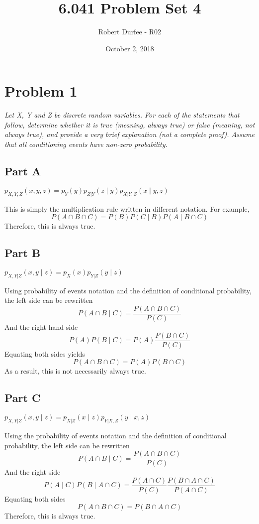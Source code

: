 \documentclass{article}
\title{6.041 Problem Set 4}
\author{Robert Durfee - R02}
\date{October 2, 2018}
\begin{document}
\maketitle

\section*{Problem 1}

\textit{Let X, Y and Z be discrete random variables. For each of the
statements that follow, determine whether it is true (meaning, always true)
or false (meaning, not always true), and provide a very brief explanation
(not a complete proof). Assume that all conditioning events have non-zero
probability.}

\subsection*{Part A}

\textit{$ p_{X,Y,Z}(x, y, z) = p_Y(y) p_{Z|Y}(z \mid y) p_{X|Y,Z}(x \mid y, z) $}

\bigbreak

This is simply the multiplication rule written in different notation. For
example,
$$ P(A \cap B \cap C) = P(B) P(C \mid B) P(A \mid B \cap C) $$
Therefore, this is always true.

\subsection*{Part B}

\textit{$ p_{X,Y|Z}(x, y \mid z) = p_X(x) p_{Y|Z} (y \mid z) $}

\bigbreak

Using probability of events notation and the definition of conditional
probability, the left side can be rewritten
$$ P(A \cap B \mid C) = \frac{P(A \cap B \cap C)}{P(C)} $$
And the right hand side
$$ P(A) P(B \mid C) = P(A) \frac{P(B \cap C)}{P(C)} $$
Equating both sides yields
$$ P(A \cap B \cap C) = P(A) P(B \cap C) $$
As a result, this is not necessarily always true.

\subsection*{Part C}

\textit{$ p_{X,Y|Z}(x, y \mid z) = p_{X|Z} (x \mid z) p_{Y|X,Z}(y \mid x, z) $}

\bigbreak

Using the probability of events notation and the definition of conditional
probability, the left side can be rewritten
$$ P(A \cap B \mid C) = \frac{P(A \cap B \cap C)}{P(C)} $$
And the right side
$$ P(A \mid C) P(B \mid A \cap C) = \frac{P(A \cap C)}{P(C)} \frac{P(B \cap A
\cap C)}{P(A \cap C)} $$
Equating both sides
$$ P(A \cap B \cap C) = P(B \cap A \cap C) $$
Therefore, this is always true.
\end{document}

